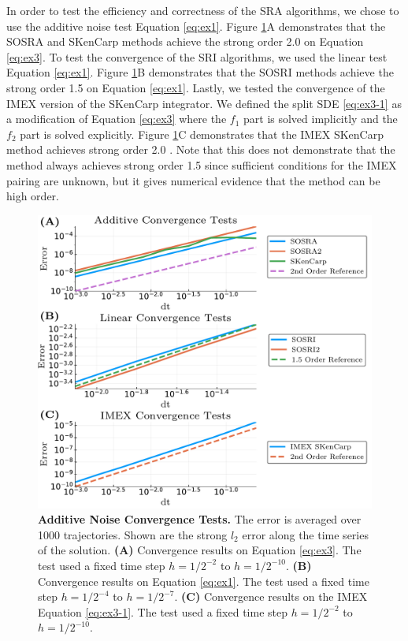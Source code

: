\documentclass{article}
\begin{document}
In order to test the efficiency and correctness of the SRA algorithms,
we chose to use the additive noise test Equation \ref{eq:ex1}. Figure
\ref{fig:convergence}A demonstrates that the SOSRA and SKenCarp methods
achieve the strong order 2.0 on Equation \ref{eq:ex3}. To test the
convergence of the SRI algorithms, we used the linear test Equation
\ref{eq:ex1}. Figure \ref{fig:convergence}B demonstrates that the
SOSRI methods achieve the strong order 1.5 on Equation \ref{eq:ex1}.
Lastly, we tested the convergence of the IMEX version of the SKenCarp
integrator. We defined the split SDE \ref{eq:ex3-1} as a modification
of Equation \ref{eq:ex3} where the $f_{1}$ part is solved implicitly
and the $f_{2}$ part is solved explicitly. Figure \ref{fig:convergence}C
demonstrates that the IMEX SKenCarp method achieves strong order 2.0
. Note that this does not demonstrate that the method always achieves
strong order 1.5 since sufficient conditions for the IMEX pairing
are unknown, but it gives numerical evidence that the method can be
high order.
\begin{center}
	\begin{figure}
		\begin{centering}
			\includegraphics[scale=0.5]{paper_figures/convergence}
			\par\end{centering}
		\caption{\textbf{Additive Noise Convergence Tests.} The error is averaged over
			1000 trajectories. Shown are the strong $l_{2}$ error along the time
			series of the solution.\textbf{ (A)} Convergence results on Equation
			\ref{eq:ex3}. The test used a fixed time step $h=1/2^{-2}$ to $h=1/2^{-10}$.\textbf{
				(B) }Convergence results on Equation \ref{eq:ex1}. The test used
			a fixed time step $h=1/2^{-4}$ to $h=1/2^{-7}$.\textbf{ (C)} Convergence
			results on the IMEX Equation \ref{eq:ex3-1}. The test used a fixed
			time step $h=1/2^{-2}$ to $h=1/2^{-10}$. \label{fig:convergence}}
	\end{figure}
	\par\end{center}
\end{document}
